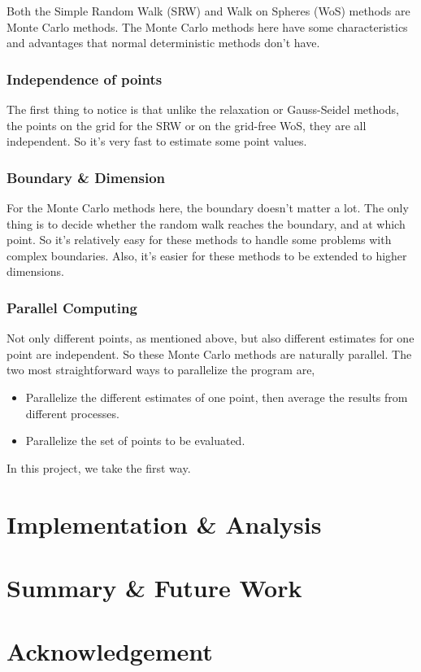 \documentclass[aps, prl, reprint, groupedaddress]{revtex4-1}
\begin{document}
Both the Simple Random Walk (SRW) and Walk on Spheres (WoS) methods are Monte Carlo methods. The Monte Carlo methods here have some characteristics and advantages that normal deterministic methods don't have.

\subsubsection{Independence of points}

The first thing to notice is that unlike the relaxation or Gauss-Seidel methods, the points on the grid for the SRW or on the grid-free WoS, they are all independent. So it's very fast to estimate some point values.

\subsubsection{Boundary \& Dimension}

For the Monte Carlo methods here, the boundary doesn't matter a lot. The only thing is to decide whether the random walk reaches the boundary, and at which point. So it's relatively easy for these methods to handle some problems with complex boundaries. Also, it's easier for these methods to be extended to higher dimensions.

\subsubsection{Parallel Computing}

Not only different points, as mentioned above, but also different estimates for one point are independent. So these Monte Carlo methods are naturally parallel. The two most straightforward ways to parallelize the program are,
\begin{itemize}
    \item Parallelize the different estimates of one point, then average the results from different processes.
    \item Parallelize the set of points to be evaluated.
\end{itemize}
In this project, we take the first way.


\section{Implementation \& Analysis}


\section{Summary \& Future Work}

\section{Acknowledgement}


\end{document}
